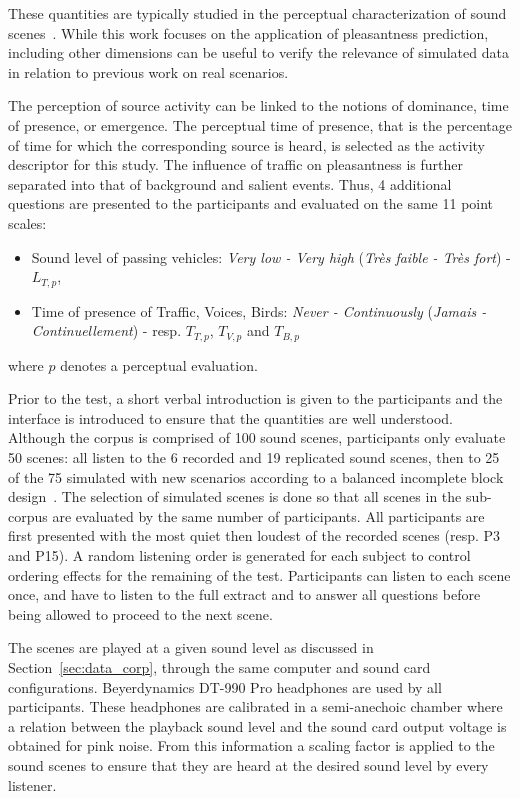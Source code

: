 \documentclass[twocolumn]{article}
\begin{document}
These quantities are typically studied in the perceptual characterization of sound scenes~\cite{axelsson2010, aumond2017, nilsson2007}. While this work focuses on the application of pleasantness prediction, including other dimensions can be useful to verify the relevance of simulated data in relation to previous work on real scenarios.

The perception of source activity can be linked to the notions of dominance, time of presence, or emergence. The perceptual time of presence, that is the percentage of time for which the corresponding source is heard, is selected as the activity descriptor for this study. The influence of traffic on pleasantness is further separated into that of background and salient events. Thus, 4 additional questions are presented to the participants and evaluated on the same 11 point scales:
\begin{itemize}
\item Sound level of passing vehicles: \textit{Very low - Very high} (\textit{Tr\`es faible - Tr\`es fort}) - $L_{T, p}$,
\item Time of presence of Traffic, Voices, Birds: \textit{Never - Continuously} (\textit{Jamais - Continuellement}) - resp. $T_{T, p}$, $T_{V, p}$ and $T_{B, p}$
\end{itemize}
where $p$ denotes a perceptual evaluation.

Prior to the test, a short verbal introduction is given to the participants and the interface is introduced to ensure that the quantities are well understood. Although the corpus is comprised of 100 sound scenes, participants only evaluate 50 scenes: all listen to the 6 recorded and 19 replicated sound scenes, then to 25 of the 75 simulated with new scenarios according to a balanced incomplete block design~\cite{dagnelie2003}. The selection of simulated scenes is done so that all scenes in the sub-corpus are evaluated by the same number of participants. All participants are first presented with the most quiet then loudest of the recorded scenes (resp. P3 and P15). A random listening order is generated for each subject to control ordering effects for the remaining of the test. Participants can listen to each scene once, and have to listen to the full extract and to answer all questions before being allowed to proceed to the next scene.

The scenes are played at a given sound level as discussed in Section~\ref{sec:data_corp}, through the same computer and sound card configurations. Beyerdynamics DT-990 Pro headphones are used by all participants. These headphones are calibrated in a semi-anechoic chamber where a relation between the playback sound level and the sound card output voltage is obtained for pink noise. From this information a scaling factor is applied to the sound scenes to ensure that they are heard at the desired sound level by every listener.
\end{document}
